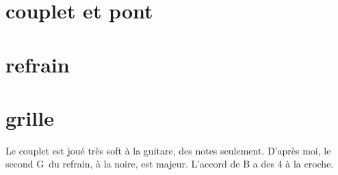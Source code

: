 \documentclass[11pt]{article}
\begin{document}
    \begin{center}
    \end{center}

%    
%
%
\begin{multicols}{2}
    \section{couplet et pont}
    

    \section{refrain}
    
    \end{multicols}

%
%
%    


    \section{grille}

    Le couplet est joué tr\`es soft à la guitare, des notes seulement.
    D'apr\`es moi, le second G\sharp~du refrain, \`a la noire, est majeur. L'accord de B a des 4 \`a la croche.



    




%    


%    

    
\end{document}
